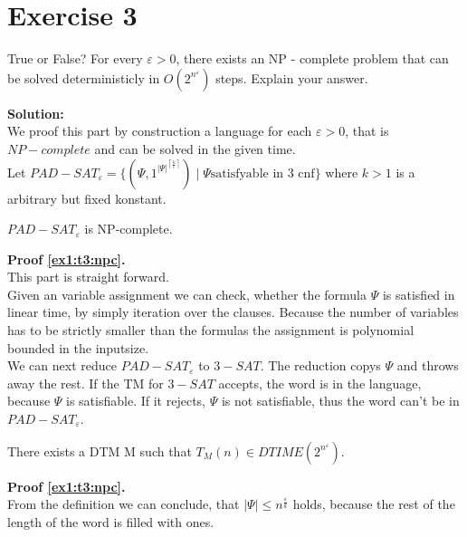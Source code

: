 \section*{Exercise 3}

True or False? For every $\varepsilon > 0$, there exists an NP - complete problem that can be solved deterministicly in
$O(2^{n^\varepsilon})$ steps. Explain your answer.

\textbf{Solution:}\\

We proof this part by construction a language for each $\varepsilon > 0$, that is $NP - complete$ and can be solved in
the given time.\\

Let $PAD-SAT_\varepsilon = \{ (\Psi , 1^{|\Psi|^{\left\lceil \frac{k}{\varepsilon} \right\rceil}}) \; | \; \Psi \text{satisfyable in 3 cnf} \}$
where $k > 1$ is a arbitrary but fixed konstant.\\

\begin{lemma}\label{ex1:t3:npc}
    $PAD-SAT_\varepsilon$ is NP-complete.
\end{lemma}

\textbf{Proof \ref{ex1:t3:npc}.}\\
This part is straight forward.\\
Given an variable assignment we can check, whether the formula $\Psi$ is satisfied in linear time, by simply iteration over
the clauses. Because the number of variables has to be strictly smaller than the formulas the assignment is polynomial bounded
in the inputsize.\\

We can next reduce $PAD-SAT_\varepsilon$ to $3-SAT$. The reduction copys $\Psi$ and throws away the rest. If 
the TM for $3 - SAT$ accepts, the word is in the language, because $\Psi$ is satisfiable. If it rejects,
$\Psi$ is not satisfiable, thus the word can't be in $PAD-SAT_\varepsilon$.

\begin{lemma}\label{ex1:t3:time}
    There exists a DTM M such that $T_M(n) \in DTIME (2^{n^\varepsilon})$.
\end{lemma}

\textbf{Proof \ref{ex1:t3:npc}.}\\

From the definition we can conclude, that $|\Psi| \leq n^{\frac{\varepsilon}{k}}$ holds,
because the rest of the length of the word is filled with ones.\\

